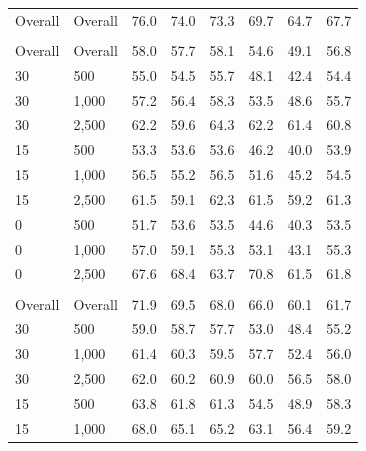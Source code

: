 \documentclass[twoside,11pt]{article}\usepackage[]{graphicx}\usepackage[]{xcolor}
\newenvironment{knitrout}{}{} %
\begin{document}
\begin{knitrout}
\begin{landscape}
\begin{longtable}[t]{llcccccc}
\endfoot
\bottomrule
\endlastfoot
Overall & Overall & 76.0 & 74.0 & 73.3 & 69.7 & 64.7 & 67.7\\
\addlinespace[0.3em]
\multicolumn{8}{l}{\textit{\textbf{Interactions}}}\\
\hline
\hspace{1em}Overall & Overall & 58.0 & 57.7 & 58.1 & 54.6 & 49.1 & 56.8\\
\hspace{1em}30 & 500 & 55.0 & 54.5 & 55.7 & 48.1 & 42.4 & 54.4\\
\hspace{1em}30 & 1,000 & 57.2 & 56.4 & 58.3 & 53.5 & 48.6 & 55.7\\
\hspace{1em}30 & 2,500 & 62.2 & 59.6 & 64.3 & 62.2 & 61.4 & 60.8\\
\hspace{1em}15 & 500 & 53.3 & 53.6 & 53.6 & 46.2 & 40.0 & 53.9\\
\hspace{1em}15 & 1,000 & 56.5 & 55.2 & 56.5 & 51.6 & 45.2 & 54.5\\
\hspace{1em}15 & 2,500 & 61.5 & 59.1 & 62.3 & 61.5 & 59.2 & 61.3\\
\hspace{1em}0 & 500 & 51.7 & 53.6 & 53.5 & 44.6 & 40.3 & 53.5\\
\hspace{1em}0 & 1,000 & 57.0 & 59.1 & 55.3 & 53.1 & 43.1 & 55.3\\
\hspace{1em}0 & 2,500 & 67.6 & 68.4 & 63.7 & 70.8 & 61.5 & 61.8\\
\addlinespace[0.3em]
\multicolumn{8}{l}{\textit{\textbf{Non-linear effects}}}\\
\hline
\hspace{1em}Overall & Overall & 71.9 & 69.5 & 68.0 & 66.0 & 60.1 & 61.7\\
\hspace{1em}30 & 500 & 59.0 & 58.7 & 57.7 & 53.0 & 48.4 & 55.2\\
\hspace{1em}30 & 1,000 & 61.4 & 60.3 & 59.5 & 57.7 & 52.4 & 56.0\\
\hspace{1em}30 & 2,500 & 62.0 & 60.2 & 60.9 & 60.0 & 56.5 & 58.0\\
\hspace{1em}15 & 500 & 63.8 & 61.8 & 61.3 & 54.5 & 48.9 & 58.3\\
\hspace{1em}15 & 1,000 & 68.0 & 65.1 & 65.2 & 63.1 & 56.4 & 59.2\\

\end{longtable}
\end{landscape}
\end{knitrout}
\end{document}
